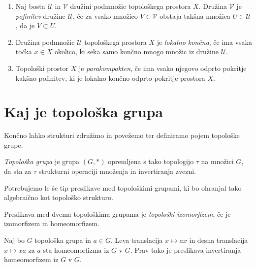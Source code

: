 \documentclass[mat1]{fmfdelo}
\begin{document}
\begin{definicija}\label{def:parakompakt}
\begin{enumerate}
\item Naj bosta $\mathcal{U}$ in $\mathcal{V}$ družini podmnožic topološkega prostora $X$. Družina $\mathcal{V}$ je \emph{pofinitev} družine $\mathcal{U}$, če za vsako množico $V \in \mathcal{V}$ obstaja takšna množica $U \in \mathcal{U}$, da je $V \subset U$.
\item Družina podmnožic $\mathcal{U}$ topološkega prostora $X$ je \emph{lokalno končna}, če ima vsaka točka $x \in X$ okolico, ki seka samo končno mnogo množic iz družine $\mathcal{U}$.
\item Topološki prostor $X$ je \emph{parakompakten}, če ima vsako njegovo odprto pokritje kakšno pofinitev, ki je lokalno končno odprto pokritje prostora $X$.
\end{enumerate}
\end{definicija}

\section{Kaj je topološka grupa}


Končno lahko strukturi združimo in povežemo ter definiramo pojem topološke grupe.
\begin{definicija}\label{def:topgrupa}
\emph{Topološka grupa} je grupa $(G, *)$ opremljena s tako topologijo $\tau$ na množici $G$, da sta za $\tau$ strukturni operaciji množenja in invertiranja zvezni. 
\end{definicija}

Potrebujemo le še tip preslikave med topološkimi grupami, ki bo ohranjal tako algebraično kot topološko strukturo.
\begin{definicija}\label{def:topizo}
Preslikava med dvema topološkima grupama je \emph{topološki izomorfizem}, če je izomorfizem in homeomorfizem.
\end{definicija}


\begin{trditev}\label{trd:trans}
Naj bo $G$ topološka grupa in $a \in G$. Leva translacija $x \mapsto ax$ in desna translacija $x \mapsto xa$ za $a$ sta homeomorfizma iz $G$ v $G$. Prav tako je preslikava invertiranja homeomorfizem iz $G$ v $G$.
\end{trditev}
\end{document}
